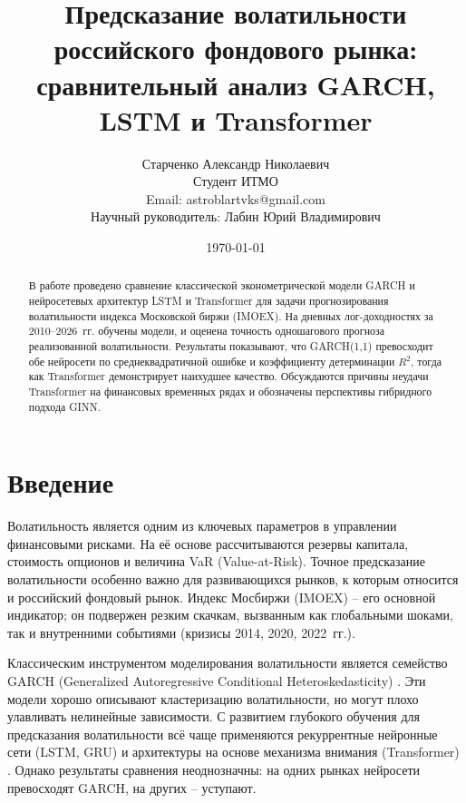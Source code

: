 \documentclass[a4paper,12pt]{article}
\begin{document}
\title{Предсказание волатильности российского фондового рынка: сравнительный анализ GARCH, LSTM и Transformer}
\author{Старченко Александр Николаевич\\
\small{Студент ИТМО}\\
\small{Email: astroblartvks@gmail.com}\\[5pt]
\small{Научный руководитель: Лабин Юрий Владимирович}}
\date{\today}
\maketitle

\begin{abstract}
В работе проведено сравнение классической эконометрической модели GARCH и нейросетевых архитектур LSTM и Transformer для задачи прогнозирования волатильности индекса Московской биржи (IMOEX). На дневных лог-доходностях за 2010--2026~гг. обучены модели, и оценена точность одношагового прогноза реализованной волатильности. Результаты показывают, что GARCH(1,1) превосходит обе нейросети по среднеквадратичной ошибке и коэффициенту детерминации \(R^2\), тогда как Transformer демонстрирует наихудшее качество. Обсуждаются причины неудачи Transformer на финансовых временных рядах и обозначены перспективы гибридного подхода GINN. 
\end{abstract}

\section{Введение}
Волатильность является одним из ключевых параметров в управлении финансовыми рисками. На её основе рассчитываются резервы капитала, стоимость опционов и величина VaR (Value-at-Risk). Точное предсказание волатильности особенно важно для развивающихся рынков, к которым относится и российский фондовый рынок. Индекс Мосбиржи (IMOEX) -- его основной индикатор; он подвержен резким скачкам, вызванным как глобальными шоками, так и внутренними событиями (кризисы 2014, 2020, 2022~гг.).

Классическим инструментом моделирования волатильности является семейство GARCH (Generalized Autoregressive Conditional Heteroskedasticity) \cite{Bollerslev1986}. Эти модели хорошо описывают кластеризацию волатильности, но могут плохо улавливать нелинейные зависимости. С развитием глубокого обучения для предсказания волатильности всё чаще применяются рекуррентные нейронные сети (LSTM, GRU) \cite{KimWon2018} и архитектуры на основе механизма внимания (Transformer) \cite{Vaswani2017}. Однако результаты сравнения неоднозначны: на одних рынках нейросети превосходят GARCH, на других -- уступают.
\end{document}
